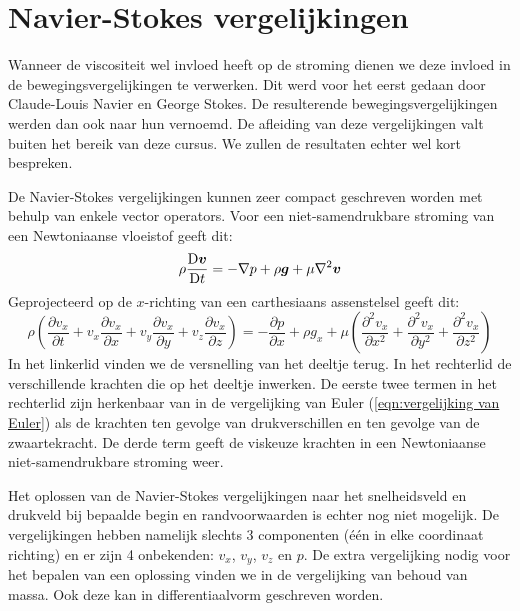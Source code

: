 	\section{Navier-Stokes vergelijkingen}
Wanneer de viscositeit wel invloed heeft op de stroming dienen we deze invloed in de bewegingsvergelijkingen te verwerken. Dit werd voor het eerst gedaan door  Claude-Louis Navier en  George Stokes. De resulterende bewegingsvergelijkingen werden dan ook naar hun vernoemd. De afleiding van deze vergelijkingen valt buiten het bereik van deze cursus. We zullen de resultaten echter wel kort bespreken.

De Navier-Stokes vergelijkingen kunnen zeer compact geschreven worden met behulp van enkele vector operators. Voor een niet-samendrukbare stroming van een Newtoniaanse vloeistof geeft dit:
\begin{equation}
	\rho \frac{\mathrm{D} \boldsymbol{v}}{\mathrm{D} t} = -\nabla p + \rho \boldsymbol{g} + \mu \nabla^2 \boldsymbol{v}
	\label{eqn:navier-stokes vergelijkingen}
\end{equation}
Geprojecteerd op de $x$-richting van een carthesiaans assenstelsel geeft dit:
\begin{equation}
	\rho \left(\frac{\partial v_x}{\partial t} + v_x \frac{\partial v_x}{\partial x} + v_y \frac{\partial v_x}{\partial y} + v_z \frac{\partial v_x}{\partial z} \right) = -\frac{\partial p}{\partial x} +\rho g_x + \mu \left( \frac{\partial^2 v_x}{\partial x^2} + \frac{\partial^2 v_x}{\partial y^2} + \frac{\partial^2 v_x}{\partial z^2} \right)
	\label{eqn:navier-stokes vergelijkingen carthesiaans}
\end{equation}
In het linkerlid vinden we de versnelling van het deeltje terug. In het rechterlid de verschillende krachten die op het deeltje inwerken. De eerste twee termen in het rechterlid zijn herkenbaar van in de vergelijking van Euler (\ref{eqn:vergelijking van Euler}) als de krachten ten gevolge van drukverschillen en ten gevolge van de zwaartekracht. De derde term geeft de viskeuze krachten in een Newtoniaanse niet-samendrukbare stroming weer.

Het oplossen van de Navier-Stokes vergelijkingen naar het snelheidsveld en drukveld bij bepaalde begin en randvoorwaarden is echter nog niet mogelijk. De vergelijkingen hebben namelijk slechts 3 componenten (één in elke coordinaat richting) en er zijn 4 onbekenden: $v_x$, $v_y$, $v_z$ en $p$. De extra vergelijking nodig voor het bepalen van een oplossing vinden we in de vergelijking van behoud van massa. Ook deze kan in differentiaalvorm geschreven worden.

